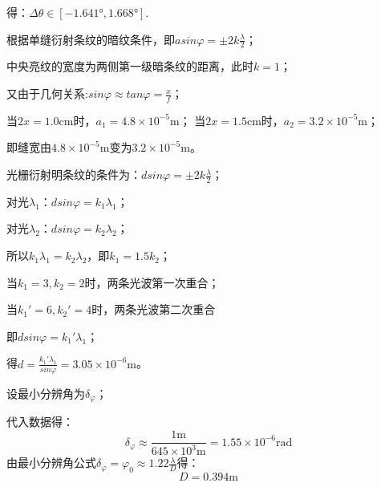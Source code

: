 得：$\Delta\theta\in[-1.641°,1.668°]$.

\exercise

\solve
根据单缝衍射条纹的暗纹条件，即$asin\varphi=\pm2k\frac{\lambda}{2}$；

中央亮纹的宽度为两侧第一级暗条纹的距离，此时$k=1$；

又由于几何关系:$sin\varphi\approx tan\varphi=\frac{x}{f}$；

当$2x=1.0\mathrm{cm}$时，$a_1=4.8\times10^{-5}\mathrm{m}$；
当$2x=1.5\mathrm{cm}$时，$a_2=3.2\times10^{-5}\mathrm{m}$；

即缝宽由$4.8\times10^{-5}\mathrm{m}$变为$3.2\times10^{-5}\mathrm{m}$。

\exercise

\solve
光栅衍射明条纹的条件为：$dsin\varphi=\pm2k\frac{\lambda}{2}$；

对光$\lambda_1$：$dsin\varphi=k_1\lambda_1$；

对光$\lambda_2$：$dsin\varphi=k_2\lambda_2$；

所以$k_1\lambda_1=k_2\lambda_2$，即$k_1=1.5k_2$；

当$k_1=3,k_2=2$时，两条光波第一次重合；

当$k_1'=6,k_2'=4$时，两条光波第二次重合

即$dsin\varphi=k_1'\lambda_1$；

得$d=\frac{k_1'\lambda_1}{sin\varphi}=3.05\times10^{-6}\mathrm{m}$。

\exercise

\solve
设最小分辨角为$\delta_\varphi$；

代入数据得：
\[
\delta_\varphi\approx\frac{1\mathrm{m}}{645\times10^{3}\mathrm{m}}=1.55\times10^{-6}\mathrm{rad}
\]
由最小分辨角公式$\delta_\varphi=\varphi_0\approx1.22\frac{\lambda}{D}$得：
\[
D=0.394\mathrm{m}
\]
